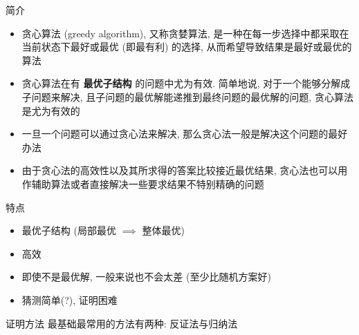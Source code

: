 \begin{frame}[fragile]{简介}

	\begin{itemize}
		\item<1-> 贪心算法 (greedy algorithm), 又称贪婪算法, 是一种在每一步选择中都采取在当前状态下最好或最优 (即最有利) 的选择, 从而希望导致结果是最好或最优的算法
		\item<2-> 贪心算法在有 \textbf{最优子结构}\xspace 的问题中尤为有效. 简单地说, 对于一个能够分解成子问题来解决, 且子问题的最优解能递推到最终问题的最优解的问题, 贪心算法是尤为有效的
		\item<3-> 一旦一个问题可以通过贪心法来解决, 那么贪心法一般是解决这个问题的最好办法
		\item<4-> 由于贪心法的高效性以及其所求得的答案比较接近最优结果, 贪心法也可以用作辅助算法或者直接解决一些要求结果不特别精确的问题
	\end{itemize}

\end{frame}


\begin{frame}[fragile]{特点}

	\begin{itemize}
		\item 最优子结构 (局部最优 \(\implies\) 整体最优)
		\item 高效
		\item 即使不是最优解, 一般来说也不会太差 (至少比随机方案好)
		\item 猜测简单(?), 证明困难
	\end{itemize}

\end{frame}


\begin{frame}[fragile]{证明方法}
	最基础最常用的方法有两种: 反证法与归纳法
\end{frame}
